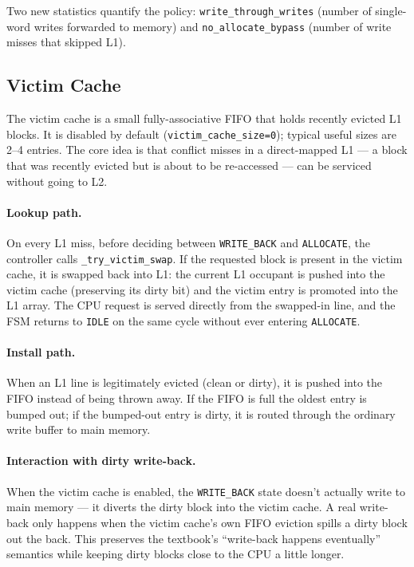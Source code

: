\documentclass[11pt,a4paper]{article}
\begin{document}
Two new statistics quantify the policy: \texttt{write\_through\_writes}
(number of single-word writes forwarded to memory) and
\texttt{no\_allocate\_bypass} (number of write misses that skipped L1).

\subsection{Victim Cache}

The victim cache is a small fully-associative FIFO that holds recently
evicted L1 blocks. It is disabled by default (\texttt{victim\_cache\_size=0});
typical useful sizes are 2–4 entries. The core idea is that conflict misses
in a direct-mapped L1 — a block that was recently evicted but is about to be
re-accessed — can be serviced without going to L2.

\paragraph{Lookup path.} On every L1 miss, before deciding between
\texttt{WRITE\_BACK} and \texttt{ALLOCATE}, the controller calls
\texttt{\_try\_victim\_swap}. If the requested block is present in the victim
cache, it is swapped back into L1: the current L1 occupant is pushed into the
victim cache (preserving its dirty bit) and the victim entry is promoted into
the L1 array. The CPU request is served directly from the swapped-in line,
and the FSM returns to \texttt{IDLE} on the same cycle without ever entering
\texttt{ALLOCATE}.

\paragraph{Install path.} When an L1 line is legitimately evicted (clean or
dirty), it is pushed into the FIFO instead of being thrown away. If the FIFO
is full the oldest entry is bumped out; if the bumped-out entry is dirty, it
is routed through the ordinary write buffer to main memory.

\paragraph{Interaction with dirty write-back.} When the victim cache is
enabled, the \texttt{WRITE\_BACK} state doesn't actually write to main memory
— it diverts the dirty block into the victim cache. A real write-back only
happens when the victim cache's own FIFO eviction spills a dirty block out
the back. This preserves the textbook's ``write-back happens eventually''
semantics while keeping dirty blocks close to the CPU a little longer.
\end{document}
